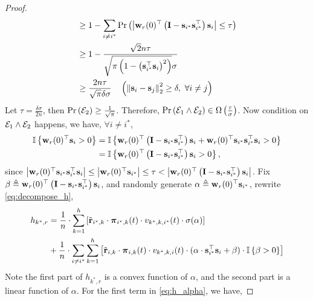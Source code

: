 \documentclass[10pt]{article}
\begin{document}
\begin{proof}
\begin{equation*}
\begin{split}
	&\ge 1 - \sum\limits_{i \not= i^*}{ {\text{Pr}}\left(\left| {\mathbf{w}}_r(0)^\top \left( {\mathbf{I}} - {\mathbf{s}}_{i^*}{\mathbf{s}}_{i^*}^\top \right) {\mathbf{s}}_i \right| \le \tau \right) } \\
	&\ge 1 - \frac{\sqrt{2}n\tau}{\sqrt{\pi\left( 1 - \left({\mathbf{s}}_{i^*}^\top {\mathbf{s}}_{i} \right)^2 \right) }\sigma} \\
	&\ge \frac{2n\tau}{\sqrt{\pi}\delta\sigma} \quad \left( \left\| {\mathbf{s}}_{i} -  {\mathbf{s}}_{j} \right\|_2^2 \ge \delta, \ \forall i \not= j \right)
\end{split}
\end{equation*}
Let $\tau = \frac{\delta\sigma}{2n}$, then ${\text{Pr}}\left({\mathcal{E}}_2\right) \ge \frac{1}{\sqrt{\pi}}$. Therefore, ${\text{Pr}}\left( {\mathcal{E}}_1 \land {\mathcal{E}}_2 \right) \in \Omega\left( \frac{\tau}{\sigma} \right)$. Now condition on ${\mathcal{E}}_1 \land {\mathcal{E}}_2$ happens, we have, $\forall i \not= i^*$,
\begin{equation*}
\begin{split}
	{\mathbb{I}}\left\{ {\mathbf{w}}_r(0)^\top {\mathbf{s}}_i > 0 \right\} &= {\mathbb{I}}\left\{ {\mathbf{w}}_r(0)^\top \left( {\mathbf{I}} - {\mathbf{s}}_{i^*}{\mathbf{s}}_{i^*}^\top \right) {\mathbf{s}}_i + {\mathbf{w}}_r(0)^\top {\mathbf{s}}_{i^*} {\mathbf{s}}_{i^*}^\top {\mathbf{s}}_{i} > 0 \right\} \\
	&= {\mathbb{I}}\left\{ {\mathbf{w}}_r(0)^\top \left( {\mathbf{I}} - {\mathbf{s}}_{i^*}{\mathbf{s}}_{i^*}^\top \right) {\mathbf{s}}_i > 0 \right\},
\end{split}
\end{equation*}
since $\left| {\mathbf{w}}_r(0)^\top {\mathbf{s}}_{i^*} {\mathbf{s}}_{i^*}^\top {\mathbf{s}}_{i} \right| \le \left| {\mathbf{w}}_r(0)^\top {\mathbf{s}}_{i^*} \right| \le \tau < \left| {\mathbf{w}}_r(0)^\top \left( {\mathbf{I}} - {\mathbf{s}}_{i^*}{\mathbf{s}}_{i^*}^\top \right) {\mathbf{s}}_i  \right|$. Fix $\beta \triangleq {\mathbf{w}}_r(0)^\top \left( {\mathbf{I}} - {\mathbf{s}}_{i^*}{\mathbf{s}}_{i^*}^\top \right) {\mathbf{s}}_i$, and randomly generate $\alpha \triangleq {\mathbf{w}}_r(0)^\top {\mathbf{s}}_{i^*}$, rewrite \cref{eq:decompose_h},
\begin{equation}
\label{eq:h_alpha}
\begin{split}
	h_{k^*,r} &= \frac{1}{n} \cdot \sum\limits_{k=1}^{h}{ \left[ {\tilde{\mathbf{r}}}_{i^*,k} \cdot {\boldsymbol{\pi}}_{i^*,k}(t) \cdot v_{k^*,k,i^*}(t) \cdot \sigma(\alpha) \right] } \\
	&+ \frac{1}{n} \cdot \sum\limits_{i \not= i^*}{\sum\limits_{k=1}^{h}{ \left[ {\tilde{\mathbf{r}}}_{i,k} \cdot {\boldsymbol{\pi}}_{i,k}(t) \cdot v_{k^*,k,i}(t) \cdot ( \alpha \cdot {\mathbf{s}}_{i^*}^\top {\mathbf{s}}_{i} + \beta ) \cdot {\mathbb{I}}\left\{ \beta > 0 \right\}  \right] } }
\end{split}
\end{equation}
Note the first part of $h_{k^*,r}$ is a convex function of $\alpha$, and the second part is a linear function of $\alpha$. For the first term in \cref{eq:h_alpha}, we have,

\end{proof}
\end{document}
